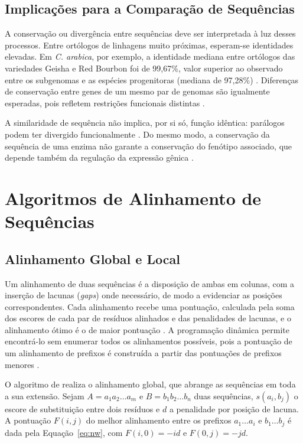 \subsection{Implicações para a Comparação de Sequências}

A conservação ou divergência entre sequências deve ser interpretada à luz desses processos. Entre ortólogos de linhagens muito próximas, esperam-se identidades elevadas. Em \textit{C. arabica}, por exemplo, a identidade mediana entre ortólogos das variedades Geisha e Red Bourbon foi de 99,67\%, valor superior ao observado entre os subgenomas e as espécies progenitoras (mediana de 97,28\%) \cite{Medrano2025}. Diferenças de conservação entre genes de um mesmo par de genomas são igualmente esperadas, pois refletem restrições funcionais distintas \cite{KimuraOhta1974}.

A similaridade de sequência não implica, por si só, função idêntica: parálogos podem ter divergido funcionalmente \cite{Koonin2005}. Do mesmo modo, a conservação da sequência de uma enzima não garante a conservação do fenótipo associado, que depende também da regulação da expressão gênica \cite{Privat2008}.

\section{Algoritmos de Alinhamento de Sequências}

\subsection{Alinhamento Global e Local}
\label{subsec:global}

Um alinhamento de duas sequências é a disposição de ambas em colunas, com a inserção de lacunas (\textit{gaps}) onde necessário, de modo a evidenciar as posições correspondentes. Cada alinhamento recebe uma pontuação, calculada pela soma dos escores de cada par de resíduos alinhados e das penalidades de lacunas, e o alinhamento ótimo é o de maior pontuação \cite{Durbin1998}. A programação dinâmica permite encontrá-lo sem enumerar todos os alinhamentos possíveis, pois a pontuação de um alinhamento de prefixos é construída a partir das pontuações de prefixos menores \cite{Durbin1998}.

O algoritmo de  realiza o alinhamento global, que abrange as sequências em toda a sua extensão. Sejam $A = a_1 a_2 \ldots a_m$ e $B = b_1 b_2 \ldots b_n$ duas sequências, $s(a_i, b_j)$ o escore de substituição entre dois resíduos e $d$ a penalidade por posição de lacuna. A pontuação $F(i,j)$ do melhor alinhamento entre os prefixos $a_1 \ldots a_i$ e $b_1 \ldots b_j$ é dada pela Equação~\ref{eq:nw}, com $F(i,0) = -i d$ e $F(0,j) = -j d$.

